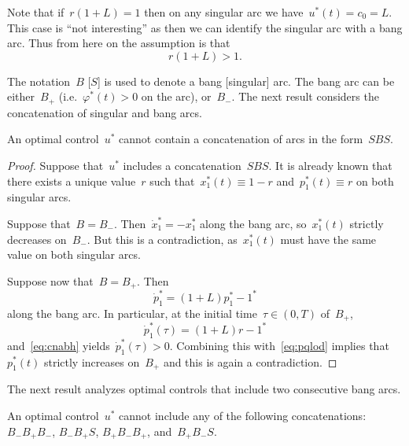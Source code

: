 Note that if~$r(1+L)=1$ then on any singular arc we have~$u^*(t)=c_0=L$.
This case is ``not interesting'' as then we can identify the singular arc with a bang arc. 
Thus from here on the assumption is that
\begin{equation}\label{eq:cnabh}
r(1+L)>1 .
\end{equation}

The notation~$B$ [$S$] is used to denote a bang [singular] arc. 
The bang arc can be either~$B_+$ (i.e.~$\varphi^*(t)>0$ on the arc), or~$B_{-}$.
The next result considers the concatenation of singular  and bang  arcs. 
\begin{proposition}
	An optimal control~$u^*$  cannot  contain a concatenation of    arcs in the form~$SBS$.
\end{proposition}

\begin{proof}
	Suppose that~$u^*$ includes a concatenation~$SBS$.  
	It is already known that there exists a unique value~$r$ such that~$x_1^*(t)\equiv 1- r$ and~$p_1^*(t)\equiv  r$ on both singular arcs. 
	
	Suppose that~$B=B_-$.
	Then~$\dot x_1^*= -x_1^*$ along the bang arc, so~$x_1^*(t)$ strictly  decreases on~$B_{-}$.
	But this is a contradiction, as~$x_1^*(t)$ must have the same value on both singular arcs. 
	
	
	Suppose now that~$B=B_+$.
	Then
	\begin{equation} \label{eq:pqlod}
		\dot p_1^*=(1+L)p_1^* -1^*
	\end{equation}
	along the bang arc.
	In particular, at the initial  time~$\tau \in(0,T)$ of~$B_+$, 
	\begin{equation}
		\dot p_1^*(\tau)=(1+L) r  -1^*
	\end{equation}
	and~\eqref{eq:cnabh} yields~$\dot p_1^*(\tau)>0$. 
	Combining this with~\eqref{eq:pqlod} implies that~$p_1^*(t)$ strictly increases on~$B_+$ and this is again a contradiction.
\end{proof}

The next result analyzes optimal controls that include two consecutive bang arcs.  
\begin{lemma}\label{lem:bnatr}
	An optimal control~$u^*$ cannot include any of the following concatenations:~$B_-B_+B_-$, $B_- B_+  S$,
	$B_+ B_- B_+ $, and~$B_+ B_- S $.
\end{lemma}

